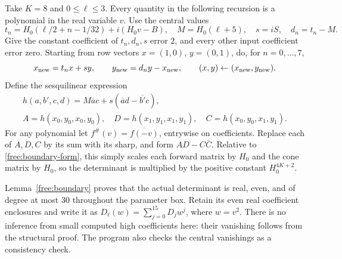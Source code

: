 \documentclass[11pt]{article}
\numberwithin{equation}{section}
\theoremstyle{definition}
\theoremstyle{remark}
\begin{document}
Take $K=8$ and $0\le\ell\le3$.  Every quantity in the following
recursion is a polynomial in the real variable $v$.  Use the central
values
\[
 t_n=H_0(\ell/2+n-1/32)+i(H_0v-B),\quad
 M=H_0(\ell+5),\quad s=iS,\quad d_n=t_n-M.
\]
Give the constant coefficient of $t_n,d_n,s$ error $2$, and every
other input coefficient error zero.  Starting from row vectors
$x=(1,0)$, $y=(0,1)$, do, for $n=0,\ldots,7$,
\begin{equation}\label{cert:forward-recipe}
 x_{\rm new}=t_nx+sy,\qquad
 y_{\rm new}=d_ny-x_{\rm new},\qquad (x,y)\leftarrow(x_{\rm new},y_{\rm new}).
\end{equation}
Define the sesquilinear expression
\[
 \begin{gathered}
 h(a,b',c,d)=M\overline a c+s(\overline a d-\overline{b'}c),
 \\
 A=h(x_0,y_0,x_0,y_0),\quad
 D=h(x_1,y_1,x_1,y_1),\quad
 C=h(x_0,y_0,x_1,y_1).
 \end{gathered}
\]
For any polynomial let $f^\#(v)=\overline{f(-v)}$, entrywise on
coefficients.  Replace each of $A,D,C$ by its sum with its sharp,
and form $AD-C\overline C$.  Relative to
\eqref{free:boundary-form}, this simply scales each forward matrix by
$H_0$ and the cone matrix by $H_0$, so the determinant is multiplied
by the positive constant $H_0^{4K+2}$.

Lemma~\ref{free:boundary} proves that the actual determinant is real,
even, and of degree at most 30 throughout the parameter box.  Retain
its even real coefficient enclosures and write it as
$D_\ell(w)=\sum_{j=0}^{15}D_jw^j$, where $w=v^2$.
There is no inference from small computed high coefficients here:
their vanishing follows from the structural proof.  The program also
checks the central vanishings as a consistency check.
\end{document}
